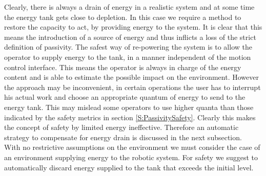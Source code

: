 \documentclass[a4paper,twoside, openright,12pt]{report}
\begin{document}
Clearly, there is always a drain of energy in a realistic system  and at some time the energy tank gets close to depletion. In this case we require a method to restore the capacity to act, by providing energy to the system. It is clear that this means the introduction of a source of energy and thus inflicts a loss of the strict definition of passivity. The safest way of re-powering the system is to allow the operator to supply energy to the tank, in a manner independent of the motion control interface. This means the operator is always in charge of the energy content and is able to estimate the possible impact on the environment. However the approach may be inconvenient, in certain operations the user has to interrupt his actual work and choose an appropriate quantum of energy to send to the energy tank. This may mislead some operators to use higher quanta than those indicated by the safety metrics in section \ref{S:PassivitySafety}. Clearly this makes the concept of safety by limited energy ineffective. Therefore an automatic strategy to compensate for energy drain is discussed in the next subsection.\\
With no restrictive assumptions on the environment we must consider the case of an environment supplying energy to the robotic system. For safety we suggest to automatically discard energy supplied to the tank that exceeds the initial level.
\end{document}
